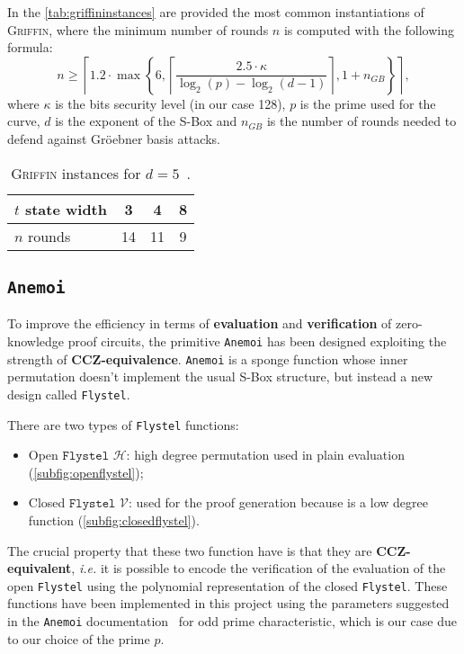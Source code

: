 \documentclass[12pt, a4paper]{report}
\begin{document}
In the \autoref{tab:griffininstances} are provided the most common instantiations of \textsc{Griffin}, where the minimum number of rounds $n$ is computed with the following formula:
\begin{equation}
  n \ge \left\lceil 1.2 \cdot \max \left\{6, \left\lceil \frac{2.5 \cdot \kappa}{\log_2(p) - \log_2(d-1)} \right\rceil, 1 + n_{GB} \right\} \right\rceil ,
  \label{eq:griffinrounds}
\end{equation}
where $\kappa$ is the bits security level (in our case 128), $p$ is the prime used for the curve, $d$ is the exponent of the S-Box and $n_{GB}$ is the number of rounds needed to defend against Gr\"oebner basis attacks.

\begin{table}[H]
  \caption{\textsc{Griffin} instances for $d = 5$~\cite[Tab.~2]{griffin}.}\label{tab:griffininstances}
  \begin{center}
    \begin{tabular}{|l|c|c|c|}
      \hline
      $t$ state width & 3 & 4 & 8 \\
      \hline
      $n$ rounds & 14 & 11 & 9 \\
      \hline
    \end{tabular}
  \end{center}
\end{table}

\subsection{\texttt{Anemoi}}\label{subsec:anemoi}

To improve the efficiency in terms of \textbf{evaluation} and \textbf{verification} of zero-knowledge proof circuits, the primitive \texttt{Anemoi} has been designed exploiting the strength of \textbf{CCZ-equivalence}.
\texttt{Anemoi} is a sponge function whose inner permutation doesn't implement the usual S-Box structure, but instead a new design called \texttt{Flystel}.

There are two types of \texttt{Flystel} functions:
\begin{itemize}
  \item Open $\texttt{Flystel}$ $\mathcal{H}$: high degree permutation used in plain evaluation (\autoref{subfig:openflystel});
  \item Closed $\texttt{Flystel}$ $\mathcal{V}$: used for the proof generation because is a low degree function (\autoref{subfig:closedflystel}).
\end{itemize}
The crucial property that these two function have is that they are \textbf{CCZ-equivalent}, \textsl{i.e.} it is possible to encode the verification of the evaluation of the open \texttt{Flystel} using the polynomial representation of the closed \texttt{Flystel}.
These functions have been implemented in this project using the parameters suggested in the \texttt{Anemoi} documentation~\cite[Sec.~4.4]{anemoi} for odd prime characteristic, which is our case due to our choice of the prime $p$.
\end{document}
